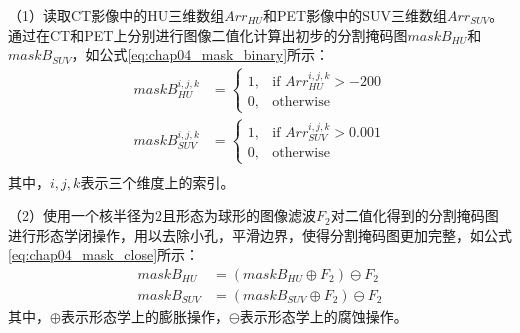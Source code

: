 （1）读取CT影像中的HU三维数组\(Arr_{HU}\)和PET影像中的SUV三维数组\(Arr_{SUV}\)。通过在CT和PET上分别进行图像二值化计算出初步的分割掩码图\(maskB_{HU}\)和\(maskB_{SUV}\)，如公式\ref{eq:chap04_mask_binary}所示：
\begin{equation}
  \begin{aligned}
    maskB_{HU}^{i, j, k}  & =
    \begin{cases}
      1 , & \text{if \(Arr_{HU}^{i, j, k} > -200\)} \\
      0 , & \text{otherwise}
    \end{cases}  \\
    maskB_{SUV}^{i, j, k} & =
    \begin{cases}
      1 , & \text{if \(Arr_{SUV}^{i, j, k} > 0.001\)} \\
      0 , & \text{otherwise}
    \end{cases} \\
  \end{aligned}
  \label{eq:chap04_mask_binary}
\end{equation}
其中，\(i,j,k\)表示三个维度上的索引。

（2）使用一个核半径为2且形态为球形的图像滤波\(F_2\)对二值化得到的分割掩码图进行形态学闭操作，用以去除小孔，平滑边界，使得分割掩码图更加完整，如公式\ref{eq:chap04_mask_close}所示：
\begin{equation}
  \begin{aligned}
    maskB_{HU}  & = (maskB_{HU} \oplus F_2 ) \ominus F_2  \\
    maskB_{SUV} & = (maskB_{SUV} \oplus F_2 ) \ominus F_2
  \end{aligned}
  \label{eq:chap04_mask_close}
\end{equation}
其中，\(\oplus\)表示形态学上的膨胀操作，\(\ominus\)表示形态学上的腐蚀操作。

